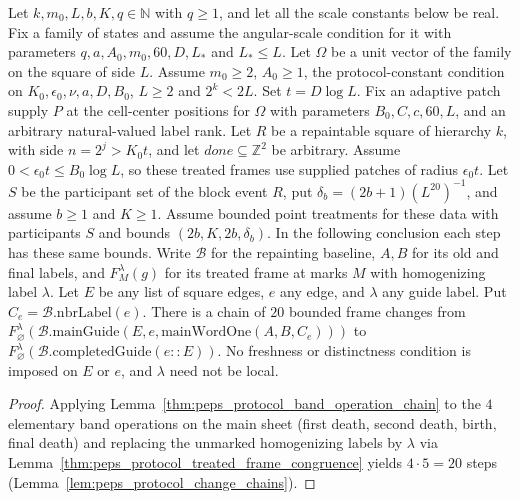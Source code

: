 \begin{lemma}
    \label{thm:peps_protocol_main_steps_chain}
    \leanok
    Let $k,m_0,L,b,K,q\in\mathbb N$ with $q\ge1$, and let all the scale
    constants below be real. Fix a family of states and assume the angular-scale
    condition for it with parameters $q,a,A_0,m_0,60,D,L_*$ and $L_*\le L$. Let
    $\Omega$ be a unit vector of the family on the square of side $L$. Assume $m_0\ge2$,
    $A_0\ge1$, the protocol-constant condition on $K_0,\epsilon_0,\nu,a,D,B_0$,
    $L\ge2$ and $2^k<2L$. Set $t=D\log L$. Fix an adaptive patch supply
    $P$ at the cell-center positions for $\Omega$ with parameters
    $B_0,C,c,60,L$, and an arbitrary natural-valued label rank.
    Let $R$ be a repaintable square of hierarchy $k$, with side $n=2^j>K_0t$,
    and let $\mathit{done}\subseteq\mathbb Z^2$ be arbitrary. Assume
    $0<\epsilon_0t\le B_0\log L$, so these treated frames use supplied
    patches of radius $\epsilon_0t$.
    Let $S$ be the participant set of the block event $R$, put
    $\delta_b=(2b+1)(L^{20})^{-1}$, and assume $b\ge1$ and $K\ge1$.
    Assume bounded point treatments for these data with participants $S$ and
    bounds $(2b,K,2b,\delta_b)$. In the following conclusion each step has
    these same bounds. Write $\mathcal B$ for the repainting baseline,
    $A,B$ for its old and final labels, and $F_M^\lambda(g)$ for its treated
    frame at marks $M$ with homogenizing label $\lambda$.
    Let $E$ be any list of square edges, $e$ any edge, and $\lambda$ any guide
    label. Put $C_e=\mathcal B.\mathrm{nbrLabel}(e)$. There is a chain of
    $20$ bounded frame changes from
    $F_\varnothing^\lambda(\mathcal B.\mathrm{mainGuide}
            (E,e,\mathrm{mainWordOne}(A,B,C_e)))$ to
    $F_\varnothing^\lambda(\mathcal B.\mathrm{completedGuide}(e::E))$.
    No freshness or distinctness condition is imposed on $E$ or $e$, and
    $\lambda$ need not be local.
\end{lemma}

\begin{proof}\leanok
    Applying Lemma~\ref{thm:peps_protocol_band_operation_chain} to the $4$ elementary band operations on the main sheet (first death, second death, birth, final death) and replacing the unmarked homogenizing labels by $\lambda$ via Lemma~\ref{thm:peps_protocol_treated_frame_congruence} yields $4\cdot 5=20$ steps (Lemma~\ref{lem:peps_protocol_change_chains}).
\end{proof}

